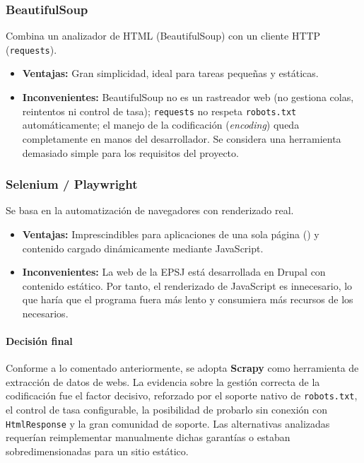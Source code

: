 \subsubsection{BeautifulSoup\cite{beautifulsoup}}

Combina un analizador de HTML (BeautifulSoup) con un cliente HTTP (\texttt{requests}).

\begin{itemize}                                                                                                                                                    
  \item \textbf{Ventajas:} Gran simplicidad, ideal para tareas pequeñas y estáticas.
  \item \textbf{Inconvenientes:} BeautifulSoup no es un rastreador web (no gestiona colas, reintentos ni control de tasa); \texttt{requests} no respeta \texttt{robots.txt} automáticamente; el manejo de la codificación (\textit{encoding}) queda completamente en manos del desarrollador. Se considera una herramienta demasiado simple para los requisitos del proyecto.
\end{itemize}

\subsubsection{Selenium \cite{selenium} / Playwright}
Se basa en la automatización de navegadores con renderizado real.

\begin{itemize}                                                                                                                                                    
  \item \textbf{Ventajas:} Imprescindibles para aplicaciones de una sola página () y contenido cargado dinámicamente mediante JavaScript.
  \item \textbf{Inconvenientes:} La web de la EPSJ está desarrollada en Drupal con contenido estático. Por tanto, el renderizado de JavaScript es innecesario, lo que haría que el programa fuera más lento y consumiera más recursos de los necesarios.
\end{itemize}


\paragraph{Decisión final}
Conforme a lo comentado anteriormente, se adopta \textbf{Scrapy} como herramienta de extracción de datos de webs. La evidencia sobre la gestión correcta de la codificación fue el factor decisivo, reforzado por el soporte nativo de \texttt{robots.txt}, el control de tasa configurable, la posibilidad de probarlo sin conexión con \texttt{HtmlResponse} y la gran comunidad de soporte. Las alternativas analizadas requerían reimplementar manualmente dichas garantías o estaban sobredimensionadas para un sitio estático.

